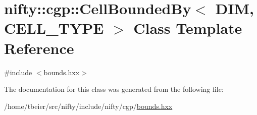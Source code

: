 \hypertarget{classnifty_1_1cgp_1_1CellBoundedBy}{}\section{nifty\+:\+:cgp\+:\+:Cell\+Bounded\+By$<$ D\+IM, C\+E\+L\+L\+\_\+\+T\+Y\+PE $>$ Class Template Reference}
\label{classnifty_1_1cgp_1_1CellBoundedBy}


{\ttfamily \#include $<$bounds.\+hxx$>$}



The documentation for this class was generated from the following file\+:\begin{DoxyCompactItemize}
\item 
/home/tbeier/src/nifty/include/nifty/cgp/\hyperlink{bounds_8hxx}{bounds.\+hxx}\end{DoxyCompactItemize}
